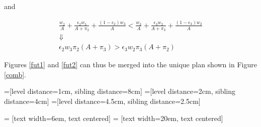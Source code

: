 \documentclass[11pt]{llncs}
\begin{document}
and

\begin{gather*}
\frac{w_2}{A}+\frac{\epsilon_2 w_3}{A+\pi_2}+\frac{(1-\epsilon_2) w_3}{A}<\frac{w_3}{A}+\frac{\epsilon_3 w_2}{A+\pi_3}+\frac{(1-\epsilon_3) w_2}{A}\\
\Downarrow\\
\epsilon_2 w_3 \pi_2(A+\pi_3)>\epsilon_3 w_2 \pi_3(A+\pi_2)
\end{gather*}

Figures \ref{fut1} and \ref{fut2} can thus be merged into the unique plan shown in Figure \ref{comb}.

=[level distance=1cm, sibling distance=8cm]
=[level distance=2cm, sibling distance=4cm]
=[level distance=4.5cm, sibling distance=2.5cm]

 = [text width=6em, text centered]
 = [text width=20em, text centered]
\end{document}
